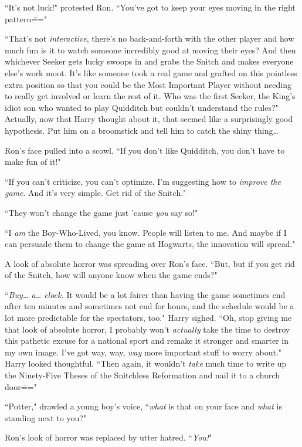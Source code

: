 ``It's not luck!" protested Ron. ``You've got to keep your eyes moving in the right pattern\==="

``That's not \emph{interactive}, there's no back-and-forth with the other player and how much fun is it to watch someone incredibly good at moving their eyes? And then whichever Seeker gets lucky swoops in and grabs the Snitch and makes everyone else's work moot. It's like someone took a real game and grafted on this pointless extra position so that you could be the Most Important Player without needing to really get involved or learn the rest of it. Who was the first Seeker, the King's idiot son who wanted to play Quidditch but couldn't understand the rules?" Actually, now that Harry thought about it, that seemed like a surprisingly good hypothesis. Put him on a broomstick and tell him to catch the shiny thing{\ldots}

Ron's face pulled into a scowl. ``If you don't like Quidditch, you don't have to make fun of it!"

``If you can't criticize, you can't optimize. I'm suggesting how to \emph{improve the game}. And it's very simple. Get rid of the Snitch."

``They won't change the game just 'cause \emph{you} say so!"

``I \emph{am} the Boy-Who-Lived, you know. People will listen to me. And maybe if I can persuade them to change the game at Hogwarts, the innovation will spread."

A look of absolute horror was spreading over Ron's face. ``But, but if you get rid of the Snitch, how will anyone know when the game ends?"

``\emph{Buy{\ldots} a{\ldots} clock.} It would be a lot fairer than having the game sometimes end after ten minutes and sometimes not end for hours, and the schedule would be a lot more predictable for the spectators, too." Harry sighed. ``Oh, stop giving me that look of absolute horror, I probably won't \emph{actually} take the time to destroy this pathetic excuse for a national sport and remake it stronger and smarter in my own image. I've got way, way, \emph{way} more important stuff to worry about." Harry looked thoughtful. ``Then again, it wouldn't \emph{take} much time to write up the Ninety-Five Theses of the Snitchless Reformation and nail it to a church door\==="

``Potter," drawled a young boy's voice, ``\emph{what} is that on your face and \emph{what} is standing next to you?"

Ron's look of horror was replaced by utter hatred. ``\emph{You!}"


